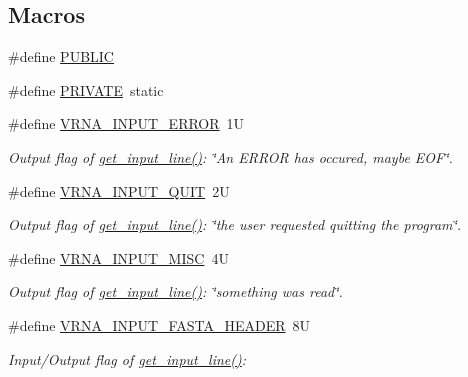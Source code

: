 \subsection*{Macros}
\begin{DoxyCompactItemize}
\item 
\#define \mbox{\hyperlink{group__utils_gad17d551e31d1828c68acf40684849b7e}{P\+U\+B\+L\+IC}}
\item 
\#define \mbox{\hyperlink{group__utils_ga5e151c615eda34903514212f05a5ccf8}{P\+R\+I\+V\+A\+TE}}~static
\item 
\#define \mbox{\hyperlink{group__utils_gad403c9ea58f1836689404c2931419c8c}{V\+R\+N\+A\+\_\+\+I\+N\+P\+U\+T\+\_\+\+E\+R\+R\+OR}}~1U
\begin{DoxyCompactList}\small\item\em Output flag of \mbox{\hyperlink{group__utils_ga8ef1835eb83f542396f59f0b205965e5}{get\+\_\+input\+\_\+line()}}\+: {\itshape \char`\"{}\+An E\+R\+R\+O\+R has occured, maybe E\+O\+F\char`\"{}}. \end{DoxyCompactList}\item 
\#define \mbox{\hyperlink{group__utils_ga72f3c6ca5c83d2b9baed2922d19c403d}{V\+R\+N\+A\+\_\+\+I\+N\+P\+U\+T\+\_\+\+Q\+U\+IT}}~2U
\begin{DoxyCompactList}\small\item\em Output flag of \mbox{\hyperlink{group__utils_ga8ef1835eb83f542396f59f0b205965e5}{get\+\_\+input\+\_\+line()}}\+: {\itshape \char`\"{}the user requested quitting the program\char`\"{}}. \end{DoxyCompactList}\item 
\#define \mbox{\hyperlink{group__utils_ga8e3241b321c9c1a78a69e59e2e019a71}{V\+R\+N\+A\+\_\+\+I\+N\+P\+U\+T\+\_\+\+M\+I\+SC}}~4U
\begin{DoxyCompactList}\small\item\em Output flag of \mbox{\hyperlink{group__utils_ga8ef1835eb83f542396f59f0b205965e5}{get\+\_\+input\+\_\+line()}}\+: {\itshape \char`\"{}something was read\char`\"{}}. \end{DoxyCompactList}\item 
\#define \mbox{\hyperlink{group__utils_ga2f0d8069e93d3ac54d9320d6bdb8e7e7}{V\+R\+N\+A\+\_\+\+I\+N\+P\+U\+T\+\_\+\+F\+A\+S\+T\+A\+\_\+\+H\+E\+A\+D\+ER}}~8U
\begin{DoxyCompactList}\small\item\em Input/\+Output flag of \mbox{\hyperlink{group__utils_ga8ef1835eb83f542396f59f0b205965e5}{get\+\_\+input\+\_\+line()}}\+:~\newline

\end{DoxyCompactList}
\end{DoxyCompactItemize}
